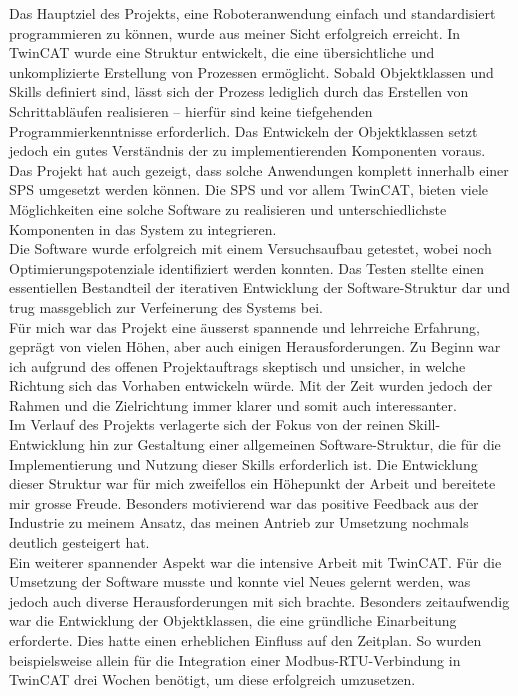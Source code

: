 Das Hauptziel des Projekts, eine Roboteranwendung einfach und standardisiert programmieren zu können, wurde aus meiner Sicht erfolgreich erreicht. In TwinCAT wurde eine Struktur entwickelt, die eine übersichtliche und unkomplizierte Erstellung von Prozessen ermöglicht. Sobald Objektklassen und Skills definiert sind, lässt sich der Prozess lediglich durch das Erstellen von Schrittabläufen realisieren – hierfür sind keine tiefgehenden Programmierkenntnisse erforderlich. Das Entwickeln der Objektklassen setzt jedoch ein gutes Verständnis der zu implementierenden Komponenten voraus.
\\
Das Projekt hat auch gezeigt, dass solche Anwendungen komplett innerhalb einer SPS umgesetzt werden können. Die SPS und vor allem TwinCAT, bieten viele Möglichkeiten eine solche Software zu realisieren und unterschiedlichste Komponenten in das System zu integrieren. 
\\
Die Software wurde erfolgreich mit einem Versuchsaufbau getestet, wobei noch Optimierungspotenziale identifiziert werden konnten. Das Testen stellte einen essentiellen Bestandteil der iterativen Entwicklung der Software-Struktur dar und trug massgeblich zur Verfeinerung des Systems bei.
\\
Für mich war das Projekt eine äusserst spannende und lehrreiche Erfahrung, geprägt von vielen Höhen, aber auch einigen Herausforderungen. Zu Beginn war ich aufgrund des offenen Projektauftrags skeptisch und unsicher, in welche Richtung sich das Vorhaben entwickeln würde. Mit der Zeit wurden jedoch der Rahmen und die Zielrichtung immer klarer und somit auch interessanter.
\\
Im Verlauf des Projekts verlagerte sich der Fokus von der reinen Skill-Entwicklung hin zur Gestaltung einer allgemeinen Software-Struktur, die für die Implementierung und Nutzung dieser Skills erforderlich ist. Die Entwicklung dieser Struktur war für mich zweifellos ein Höhepunkt der Arbeit und bereitete mir grosse Freude. Besonders motivierend war das positive Feedback aus der Industrie zu meinem Ansatz, das meinen Antrieb zur Umsetzung nochmals deutlich gesteigert hat.
\\
Ein weiterer spannender Aspekt war die intensive Arbeit mit TwinCAT. Für die Umsetzung der Software musste und konnte viel Neues gelernt werden, was jedoch auch diverse Herausforderungen mit sich brachte. Besonders zeitaufwendig war die Entwicklung der Objektklassen, die eine gründliche Einarbeitung erforderte. Dies hatte einen erheblichen Einfluss auf den Zeitplan. So wurden beispielsweise allein für die Integration einer Modbus-RTU-Verbindung in TwinCAT drei Wochen benötigt, um diese erfolgreich umzusetzen.
